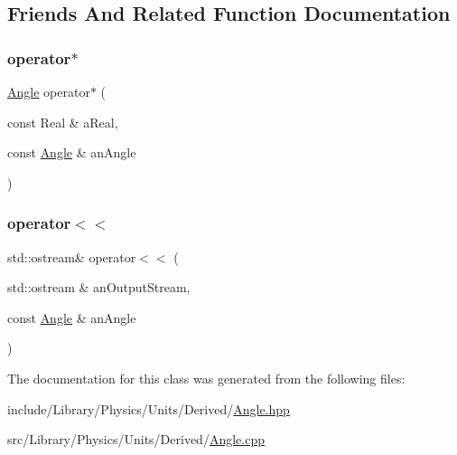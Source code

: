 \subsection{Friends And Related Function Documentation}
\mbox{\label{classlibrary_1_1physics_1_1units_1_1_angle_af699984b24759466957ecddaa7e61fc9}} 
\subsubsection{\texorpdfstring{operator$\ast$}{operator*}}
{\footnotesize\ttfamily \hyperlink{classlibrary_1_1physics_1_1units_1_1_angle}{Angle} operator$\ast$ (\begin{DoxyParamCaption}\item[{const Real \&}]{a\+Real,  }\item[{const \hyperlink{classlibrary_1_1physics_1_1units_1_1_angle}{Angle} \&}]{an\+Angle }\end{DoxyParamCaption})\hspace{0.3cm}{\ttfamily [friend]}}

\mbox{\label{classlibrary_1_1physics_1_1units_1_1_angle_a0846b77ee3281e8a559197c3c3208eed}} 
\subsubsection{\texorpdfstring{operator$<$$<$}{operator<<}}
{\footnotesize\ttfamily std\+::ostream\& operator$<$$<$ (\begin{DoxyParamCaption}\item[{std\+::ostream \&}]{an\+Output\+Stream,  }\item[{const \hyperlink{classlibrary_1_1physics_1_1units_1_1_angle}{Angle} \&}]{an\+Angle }\end{DoxyParamCaption})\hspace{0.3cm}{\ttfamily [friend]}}



The documentation for this class was generated from the following files\+:\begin{DoxyCompactItemize}
\item 
include/\+Library/\+Physics/\+Units/\+Derived/\hyperlink{_angle_8hpp}{Angle.\+hpp}\item 
src/\+Library/\+Physics/\+Units/\+Derived/\hyperlink{_angle_8cpp}{Angle.\+cpp}\end{DoxyCompactItemize}
